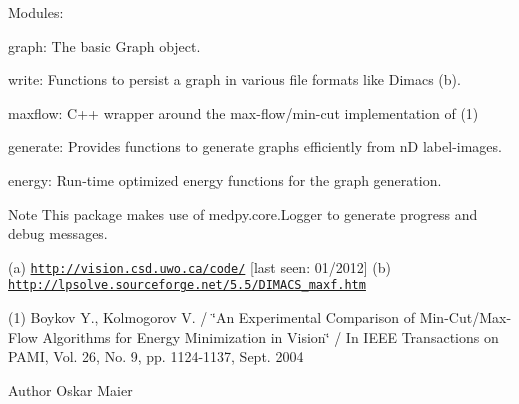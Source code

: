 Modules:
\begin{DoxyItemize}
\item graph: The basic Graph object.
\item write: Functions to persist a graph in various file formats like Dimacs (b).
\item maxflow: C++ wrapper around the max-\/flow/min-\/cut implementation of (1)
\item generate: Provides functions to generate graphs efficiently from nD label-\/images.
\item energy: Run-\/time optimized energy functions for the graph generation.
\end{DoxyItemize}

\begin{DoxyNote}{Note}
This package makes use of  medpy.core.Logger to generate progress and debug messages.
\end{DoxyNote}
(a) \href{http://vision.csd.uwo.ca/code/}{\tt http://vision.csd.uwo.ca/code/} \mbox{[}last seen: 01/2012\mbox{]} (b) \href{http://lpsolve.sourceforge.net/5.5/DIMACS_maxf.htm}{\tt http://lpsolve.sourceforge.net/5.5/DIMACS\_\-maxf.htm}

(1) Boykov Y., Kolmogorov V. / \char`\"{}An Experimental Comparison of Min-\/Cut/Max-\/Flow
 Algorithms for Energy Minimization in Vision\char`\"{} / In IEEE Transactions on PAMI, Vol. 26, No. 9, pp. 1124-\/1137, Sept. 2004

\begin{DoxyAuthor}{Author}
Oskar Maier 
\end{DoxyAuthor}
